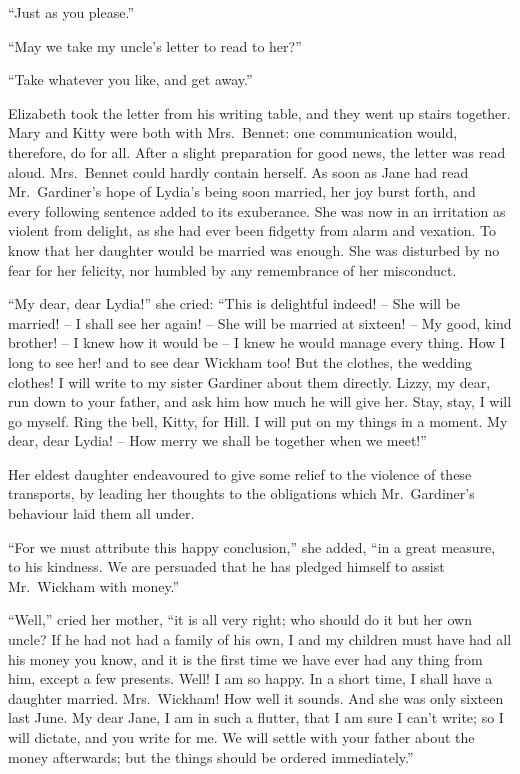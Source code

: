 “Just as you please.”

“May we take my uncle’s letter to read to her?”

“Take whatever you like, and get away.”

Elizabeth took the letter from his writing table, and
they went up stairs together. Mary and Kitty were both
with Mrs.\ Bennet: one communication would, therefore,
do for all. After a slight preparation for good news, the
letter was read aloud. Mrs.\ Bennet could hardly contain
herself. As soon as Jane had read Mr.\ Gardiner’s hope
of Lydia’s being soon married, her joy burst forth, and
every following sentence added to its exuberance. She
was now in an irritation as violent from delight, as she
had ever been fidgetty from alarm and vexation. To know
that her daughter would be married was enough. She
was disturbed by no fear for her felicity, nor humbled
by any remembrance of her misconduct.

“My dear, dear Lydia!” she cried: “This is delightful
indeed! -- She will be married! -- I shall see her again! -- She
will be married at sixteen! -- My good, kind brother! -- I
knew how it would be -- I knew he would manage every
thing. How I long to see her! and to see dear Wickham
too! But the clothes, the wedding clothes! I will write
to my sister Gardiner about them directly. Lizzy, my
dear, run down to your father, and ask him how much
he will give her. Stay, stay, I will go myself. Ring the
bell, Kitty, for Hill. I will put on my things in a moment.
My dear, dear Lydia! -- How merry we shall be together
when we meet!”

Her eldest daughter endeavoured to give some relief to
the violence of these transports, by leading her thoughts
to the obligations which Mr.\ Gardiner’s behaviour laid
them all under.

“For we must attribute this happy conclusion,” she
added, “in a great measure, to his kindness. We are
persuaded that he has pledged himself to assist Mr.\ Wickham
with money.”

“Well,” cried her mother, “it is all very right; who
should do it but her own uncle? If he had not had
a family of his own, I and my children must have had all
his money you know, and it is the first time we have ever
had any thing from him, except a few presents. Well!
I am so happy. In a short time, I shall have a daughter
married. Mrs.\ Wickham! How well it sounds. And she
was only sixteen last June. My dear Jane, I am in such
a flutter, that I am sure I can’t write; so I will dictate,
and you write for me. We will settle with your father
about the money afterwards; but the things should be
ordered immediately.”

